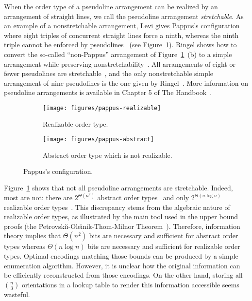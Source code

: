 When the order type of a pseudoline arrangement can be realized by an
arrangement of straight lines, we call the pseudoline arrangement
\emph{stretchable}.
%
As an example of a nonstretchable arrangement, Levi gives Pappus's
configuration where eight triples of concurrent straight lines force a ninth,
whereas the ninth triple cannot be enforced by pseudolines~\cite{Le26} (see
Figure~\ref{fig:pappus}).
%
Ringel shows how to convert the so-called ``non-Pappus'' arrangement of
Figure~\ref{fig:pappus}~(b) to a simple arrangement while preserving
nonstretchability~\cite{Ri56}.
%
All arrangements of eight or fewer pseudolines are stretchable~\cite{GP80}, and
the only nonstretchable simple arrangement of nine pseudolines is the one given
by Ringel~\cite{Ri89}.
%
More information on pseudoline arrangements is available in Chapter 5 of The
Handbook~\cite{Go04}.

\begin{figure}
	\centering{}
    \begin{subfigure}[t]{0.5\textwidth}
		\centering{}
		\texttt{[image: figures/pappus-realizable]}
		\caption{Realizable order type.}
    \end{subfigure}%
    \begin{subfigure}[t]{0.5\textwidth}
		\centering{}
		\texttt{[image: figures/pappus-abstract]}
		\caption{Abstract order type which is not realizable.}
    \end{subfigure}
	\caption{Pappus's configuration.}\label{fig:pappus}
\end{figure}

Figure~\ref{fig:pappus} shows that not all pseudoline arrangements are
stretchable. Indeed, most are not: there are \(2^{\Theta(n^2)}\)
abstract order types~\cite{Fe96} and only \(2^{\Theta(n \log n)}\) realizable
order types~\cite{Al86,GP86}.
%
\ifeurocg\else%
This discrepancy stems from the algebraic nature of realizable order types, as
illustrated by the main tool used in the upper bound proofs (the
Petrovski\u{\i}-Ole\u{\i}nik-Thom-Milnor Theorem~\cite{Mi64,Th65,BPR06}).
\fi%
%
Therefore, information theory implies that \(\Theta(n^2)\) bits are necessary
and sufficient for abstract order types whereas \(\Theta(n \log n)\) bits are
necessary and sufficient for realizable order types.
Optimal encodings matching those bounds can be produced
by a simple enumeration algorithm.
%
However, it is unclear how the original information can be
efficiently reconstructed from those encodings.
%
On the other hand, storing all \( \binom{n}{3} \) orientations in a lookup
table to render this information accessible seems wasteful.

